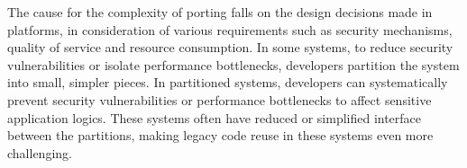 The cause for the complexity of porting
falls on the design decisions made in platforms,
in consideration of various requirements
such as security mechanisms, quality of service and resource consumption.
In some systems, 
to reduce security vulnerabilities or isolate performance bottlenecks,
developers partition the system into
small, simpler pieces.
In partitioned systems,
developers can systematically prevent
security vulnerabilities or performance bottlenecks
to affect sensitive application logics.
These systems often have
reduced or simplified interface between the partitions,
making legacy code reuse
in these systems even more challenging.









